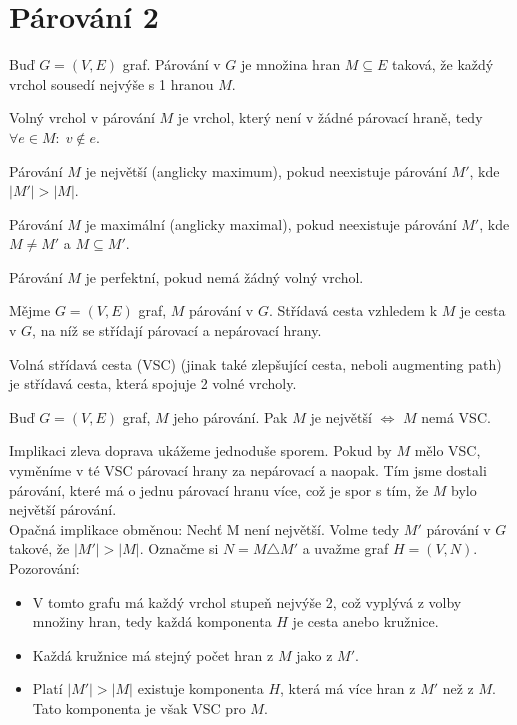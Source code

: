\section{Párování 2}
\begin{t_definition}
  Buď $G=(V,E)$ graf. Párování v $G$ je množina hran $M \subseteq E$ taková, že každý vrchol sousedí nejvýše s 1 hranou $M$. \\
\end{t_definition}
\begin{t_definition}
  Volný vrchol v párování $M$ je vrchol, který není v žádné párovací hraně, tedy $\forall e \in M: \; v \not\in e$.
\end{t_definition}
\begin{t_definition}
  Párování $M$ je největší (anglicky maximum), pokud neexistuje párování $M'$, kde $|M'| > |M|$.
\end{t_definition}
\begin{t_definition}
  Párování $M$ je maximální (anglicky maximal), pokud neexistuje párování $M'$, kde $M \neq M'$ a $M \subseteq M'$.
\end{t_definition}
\begin{t_definition}
  Párování $M$ je perfektní, pokud nemá žádný volný vrchol.
\end{t_definition}
\begin{t_definition}
  Mějme $G=(V,E)$ graf, $M$ párování v $G$. Střídavá cesta vzhledem k $M$ je cesta v $G$, na níž se střídají párovací a nepárovací hrany.
\end{t_definition}
\begin{t_definition}
  Volná střídavá cesta (VSC) (jinak také zlepšující cesta, neboli augmenting path) je střídavá cesta, která spojuje 2 volné vrcholy.
\end{t_definition}
\begin{t_lemma}
  Buď $G=(V,E)$ graf, $M$ jeho párování. Pak $M$ je největší $\iff$ $M$ nemá VSC.
\end{t_lemma}
\begin{t_proof}
  Implikaci zleva doprava ukážeme jednoduše sporem. Pokud by $M$ mělo VSC, vyměníme v té VSC párovací hrany za nepárovací a naopak. Tím jsme dostali párování, které má o jednu párovací hranu více, což je spor s tím, že $M$ bylo největší párování. \\
  Opačná implikace obměnou: Nechť M není největší. Volme tedy $M'$ párování v $G$ takové, že $|M'| > |M|$. Označme si $N = M \triangle M'$ a uvažme graf $H=(V,N)$. Pozorování: 
  \begin{itemize}
    \item V tomto grafu má každý vrchol stupeň nejvýše 2, což vyplývá z volby množiny hran, tedy každá komponenta $H$ je cesta anebo kružnice. 
    \item Každá kružnice má stejný počet hran z $M$ jako z $M'$. 
    \item Platí $|M'| > |M|$ \implies existuje komponenta $H$, která má více hran z $M'$ než z $M$. Tato komponenta je však VSC pro $M$.
  \end{itemize}
\end{t_proof}
